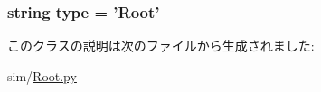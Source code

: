 \label{classRoot_1_1Root_a8645bacb1accc24cced37b66213d5a10}
\hypertarget{classRoot_1_1Root_acce15679d830831b0bbe8ebc2a60b2ca}{
\subsubsection[{type}]{\setlength{\rightskip}{0pt plus 5cm}string {\bf type} = '{\bf Root}'}}
\label{classRoot_1_1Root_acce15679d830831b0bbe8ebc2a60b2ca}


このクラスの説明は次のファイルから生成されました:\begin{DoxyCompactItemize}
\item 
sim/\hyperlink{Root_8py}{Root.py}\end{DoxyCompactItemize}
